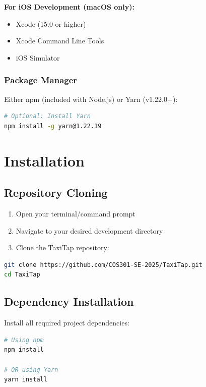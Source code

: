 \documentclass[a4paper,12pt]{article}
\begin{document}
\textbf{For iOS Development (macOS only):}
\begin{itemize}
    \item Xcode (15.0 or higher)
    \item Xcode Command Line Tools
    \item iOS Simulator
\end{itemize}

\subsubsection{Package Manager}

Either npm (included with Node.js) or Yarn (v1.22.0+):

\begin{lstlisting}[language=bash]
# Optional: Install Yarn
npm install -g yarn@1.22.19
\end{lstlisting}

\section{Installation}

\subsection{Repository Cloning}

\begin{enumerate}
    \item Open your terminal/command prompt
    \item Navigate to your desired development directory
    \item Clone the TaxiTap repository:
\end{enumerate}

\begin{lstlisting}[language=bash]
git clone https://github.com/COS301-SE-2025/TaxiTap.git
cd TaxiTap
\end{lstlisting}

\subsection{Dependency Installation}

Install all required project dependencies:

\begin{lstlisting}[language=bash]
# Using npm
npm install

# OR using Yarn
yarn install
\end{lstlisting}
\end{document}
